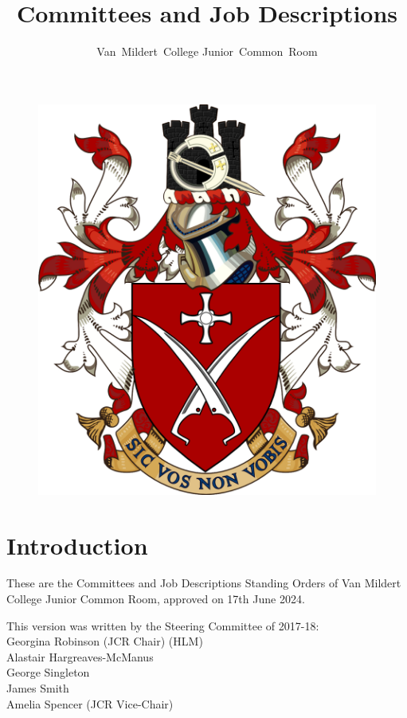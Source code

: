 \documentclass[12pt]{article}
\title{Committees and Job Descriptions}
\author{Van~Mildert~College Junior~Common~Room}
\date{\thedate}
\newcommand{\thedate}{17th June 2024}
\begin{document}
\begin{titlepage}  %
    \maketitle
    \begin{figure}[h]
    \includegraphics[scale=0.5]{arms}  %
    \centering
    \end{figure}
    \thispagestyle{empty}
\end{titlepage}

\setcounter{page}{2}  %
\section*{Introduction}
These are the Committees and Job Descriptions Standing Orders of Van Mildert College Junior Common Room, approved on \thedate.

This version was written by the Steering Committee of 2017-18:\\
\hspace*{2cm}Georgina Robinson (JCR Chair) (HLM)\\
\hspace*{2cm}Alastair Hargreaves-McManus\\
\hspace*{2cm}George Singleton\\
\hspace*{2cm}James Smith\\
\hspace*{2cm}Amelia Spencer (JCR Vice-Chair)
\end{document}

